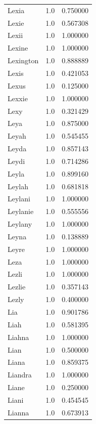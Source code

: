 \documentclass[
  letterpaper,
  DIV=11,
  numbers=noendperiod]{scrreprt}
\begin{document}
\begin{tabular}{lrr}
Lexia           &   1.0 &   0.750000 \\
Lexie           &   1.0 &   0.567308 \\
Lexii           &   1.0 &   1.000000 \\
Lexine          &   1.0 &   1.000000 \\
Lexington       &   1.0 &   0.888889 \\
Lexis           &   1.0 &   0.421053 \\
Lexus           &   1.0 &   0.125000 \\
Lexxie          &   1.0 &   1.000000 \\
Lexy            &   1.0 &   0.321429 \\
Leya            &   1.0 &   0.875000 \\
Leyah           &   1.0 &   0.545455 \\
Leyda           &   1.0 &   0.857143 \\
Leydi           &   1.0 &   0.714286 \\
Leyla           &   1.0 &   0.899160 \\
Leylah          &   1.0 &   0.681818 \\
Leylani         &   1.0 &   1.000000 \\
Leylanie        &   1.0 &   0.555556 \\
Leylany         &   1.0 &   1.000000 \\
Leyna           &   1.0 &   0.138889 \\
Leyre           &   1.0 &   1.000000 \\
Leza            &   1.0 &   1.000000 \\
Lezli           &   1.0 &   1.000000 \\
Lezlie          &   1.0 &   0.357143 \\
Lezly           &   1.0 &   0.400000 \\
Lia             &   1.0 &   0.901786 \\
Liah            &   1.0 &   0.581395 \\
Liahna          &   1.0 &   1.000000 \\
Lian            &   1.0 &   0.500000 \\
Liana           &   1.0 &   0.859375 \\
Liandra         &   1.0 &   1.000000 \\
Liane           &   1.0 &   0.250000 \\
Liani           &   1.0 &   0.454545 \\
Lianna          &   1.0 &   0.673913 \\

\end{tabular}
\end{document}
